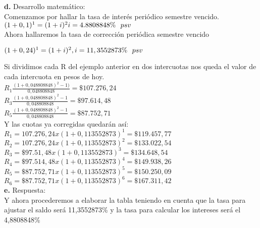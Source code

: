\textbf{d.}	Desarrollo matemático:\\
Comenzamos por hallar la tasa de interés periódico semestre vencido.\\


	$(1 +0,1)^{1}= (1 +i)^{2}  \\  i= 4.8808848 \% \ \ psv$\\

Ahora hallaremos la tasa de corrección periódica semestre vencido

	$(1 +0,24)^{1}= (1 +i)^{2}, \ \\ i= 11,3552873 \% \ \ psv$

Si dividimos cada R del ejemplo anterior en dos intercuotas nos queda el valor de cada intercuota en pesos de hoy.\\


	$R_{1}  \frac{(1+0,048808848)^{2}-1)}{0,048808848}= \$ 107.276,24$\\
	
	$R_{3}  \frac{(1+0,048808848)^{2}-1}{0,048808848}=\$ 97.614,48$\\
	
	$R_{5}  \frac{(1+0,048808848)^{2}-1}{0,048808848}=\$ 87.752,71$\\

Y las cuotas ya corregidas quedarán así:\\


	$R_{1}= 107.276,24 x (1 +0,113552873)^{1}= \$119. 457,77$ \\
	
	$R _{2}= 107.276,24 x (1 +0,113552873)^{2}= \$133. 022,54$ \\
	
	$R_{3}=\$97.51,48 x (1 +0,113552873)^{3}= \$134. 648,54$\\
	
	$R_{4}=\$97.514,48 x (1 +0,113552873)^{4}= \$149. 938,26$\\
	
	$R_{5}=\$87.752,71 x (1+0,113552873)^{5}= \$150. 250,09$\\
	
	$R_{6}=\$87.752,71 x (1 +0,113552873)^{6}=\$167. 311,42$\\
	

\textbf{e.}	Respuesta:\\
Y ahora procederemos a elaborar la tabla teniendo en cuenta que la tasa para ajustar el saldo será 11,3552873\% y la tasa para calcular los intereses será el 4,8808848\%


